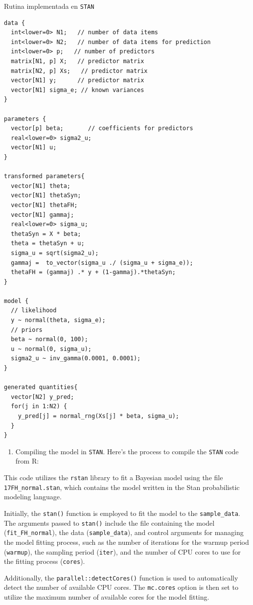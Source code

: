 \documentclass[
  12pt,
]{book}
\providecommand{\tightlist}{%
  \setlength{\itemsep}{0pt}\setlength{\parskip}{0pt}}
\begin{document}
Rutina implementada en \texttt{STAN}

\begin{verbatim}
data {
  int<lower=0> N1;   // number of data items
  int<lower=0> N2;   // number of data items for prediction
  int<lower=0> p;   // number of predictors
  matrix[N1, p] X;   // predictor matrix
  matrix[N2, p] Xs;   // predictor matrix
  vector[N1] y;      // predictor matrix 
  vector[N1] sigma_e; // known variances
}

parameters {
  vector[p] beta;       // coefficients for predictors
  real<lower=0> sigma2_u;
  vector[N1] u;
}

transformed parameters{
  vector[N1] theta;
  vector[N1] thetaSyn;
  vector[N1] thetaFH;
  vector[N1] gammaj;
  real<lower=0> sigma_u;
  thetaSyn = X * beta;
  theta = thetaSyn + u;
  sigma_u = sqrt(sigma2_u);
  gammaj =  to_vector(sigma_u ./ (sigma_u + sigma_e));
  thetaFH = (gammaj) .* y + (1-gammaj).*thetaSyn; 
}

model {
  // likelihood
  y ~ normal(theta, sigma_e); 
  // priors
  beta ~ normal(0, 100);
  u ~ normal(0, sigma_u);
  sigma2_u ~ inv_gamma(0.0001, 0.0001);
}

generated quantities{
  vector[N2] y_pred;
  for(j in 1:N2) {
    y_pred[j] = normal_rng(Xs[j] * beta, sigma_u);
  }
}
\end{verbatim}

\begin{enumerate}
\def\labelenumi{\arabic{enumi}.}
\setcounter{enumi}{3}
\tightlist
\item
  Compiling the model in \texttt{STAN}.
  Here's the process to compile the \texttt{STAN} code from R:
\end{enumerate}

This code utilizes the \texttt{rstan} library to fit a Bayesian model using the file \texttt{17FH\_normal.stan}, which contains the model written in the Stan probabilistic modeling language.

Initially, the \texttt{stan()} function is employed to fit the model to the \texttt{sample\_data}. The arguments passed to \texttt{stan()} include the file containing the model (\texttt{fit\_FH\_normal}), the data (\texttt{sample\_data}), and control arguments for managing the model fitting process, such as the number of iterations for the warmup period (\texttt{warmup}), the sampling period (\texttt{iter}), and the number of CPU cores to use for the fitting process (\texttt{cores}).

Additionally, the \texttt{parallel::detectCores()} function is used to automatically detect the number of available CPU cores. The \texttt{mc.cores} option is then set to utilize the maximum number of available cores for the model fitting.
\end{document}
